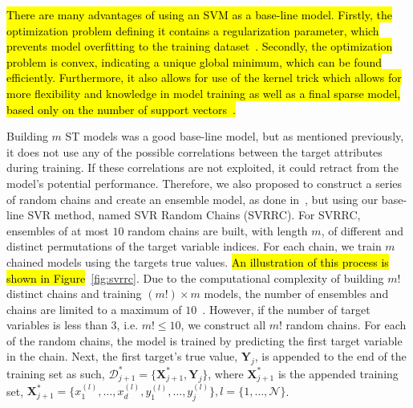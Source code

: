\documentclass[preprint,12pt]{elsarticle}
\begin{document}
\hl{There are many advantages of using an SVM as a base-line model. Firstly, the optimization problem defining it contains a regularization parameter, which prevents model overfitting to the training dataset{~\cite{Boyd}}. Secondly, the optimization problem is convex, indicating a unique global minimum, which can be found efficiently. Furthermore, it also allows for use of the kernel trick which allows for more flexibility and knowledge in model training as well as a final sparse model, based only on the number of support vectors{~\cite{Kecman}}.}

Building $m$ ST models was a good base-line model, but as mentioned previously, it does not use any of the possible correlations between the target attributes during training. If these correlations are not exploited, it could retract from the model's potential performance. Therefore, we also proposed to construct a series of random chains and create an ensemble model, as done in~\cite{Spyromitros2014}, but using our base-line SVR method, named SVR Random Chains (SVRRC). For SVRRC, ensembles of at most $10$ random chains are built, with length $m$, of different and distinct permutations of the target variable indices. For each chain, we train $m$ chained models using the targets true values. \hl{An illustration of this process is shown in Figure}~\ref{fig:svrrc}. Due to the computational complexity of building $m!$ distinct chains and training $\left(m!\right) \times m$ models, the number of ensembles and chains are limited to a maximum of $10$~\cite{Spyromitros2014}. However, if the number of target variables is less than $3$, i.e. $m! \leq 10$, we construct all $m!$ random chains. For each of the random chains, the model is trained by predicting the first target variable in the chain. Next, the first target's true value, $\bm Y_j$, is appended to the end of the training set as such, $\mathcal{D}_{j+1}^* = \{\bm X_{j+1}^*, \bm Y_j\}$, where $\bm X_{j+1}^*$ is the appended training set, ${\bm X_{j+1}^* = \{x_1^{(l)},\ldots,x_d^{(l)},y_1^{(l)},\ldots,y_j^{(l)}\},l=\{1,\ldots,\mathcal N\}}$. 
\end{document}
